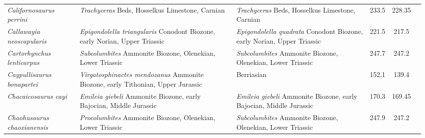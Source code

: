 \begin{longtabu}{>{\itshape}lXXSSl}
	Californosaurus perrini                              & \emph{Trachyceras} Beds, Hosselkus Limestone, Carnian                                                                              & \emph{Trachyceras} Beds, Hosselkus Limestone, Carnian                                                                              & 233.5                    & 228.35                   & \cite{Merriam1902,Merriam1908} \\        
	Callawayia neoscapularis                             & \emph{Epigondolella triangularis} Conodont Biozone, early Norian, Upper Triassic                                                   & \emph{Epigondolella quadrata} Conodont Biozone, early Norian, Upper Triassic                                                       & 221.5                    & 217.5                    & \cite{McGowan1994a} \\                   
	Cartorhynchus lenticarpus                            & \emph{Subcolumbites} Ammonite Biozone, Olenekian, Lower Triassic                                                                   & \emph{Subcolumbites} Ammonite Biozone, Olenekian, Lower Triassic                                                                   & 247.7                    & 247.2                    & \cite{Motani2014a} \\                    
	Caypullisaurus bonapartei                            & \emph{Virgatosphinactes mendozanus} Ammonite Biozone, early Tithonian, Upper Jurassic                                              & Berriasian                                                                                                                         & 152.1                    & 139.4                    & \cite{Fernandez1997a} \\                 
	Chacaicosaurus cayi                                  & \emph{Emileia giebeli} Ammonite Biozone, early Bajocian, Middle Jurassic                                                           & \emph{Emileia giebeli} Ammonite Biozone, early Bajocian, Middle Jurassic                                                           & 170.3                    & 169.45                   & \cite{Fernandez1994} \\                  
	Chaohusaurus chaoxianensis                           & \emph{Procolumbites} Ammonite Biozone, Olenekian, Lower Triassic                                                                   & \emph{Subcolumbites} Ammonite Biozone, Olenekian, Lower Triassic                                                                   & 247.9                    & 247.2                    & \cite{Motani2014,Motani2015} \\          

\end{longtabu}
